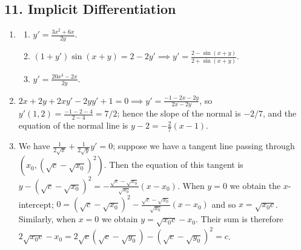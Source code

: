 \subsection*{11. Implicit Differentiation}
\begin{enumerate}
  \item
    \begin{enumerate}
      \item $ y' = \frac{3x^2 + 6x}{2y} $.
      \item $ (1 + y')\sin(x + y) = 2 - 2y' \implies y' = \frac{2 - \sin(x + y)}{2 + \sin(x + y)} $.
      \item $ y' = \frac{20x^3 - 2x}{2y} $.
    \end{enumerate}
  \item $ 2x + 2y + 2xy' - 2yy' + 1 = 0 \implies y' = \frac{-1 - 2x - 2y}{2x - 2y} $, so $ y'(1,2) = \frac{-1 - 2 - 4}{2 - 4} = 7/2 $; hence the
        slope of the normal is $ -2/7 $, and the equation of the normal line is $ y - 2 = -\frac{2}{7}(x - 1) $.
  \item We have $ \frac{1}{2\sqrt{x}} + \frac{1}{2\sqrt{y}} y' = 0 $; suppose we have a tangent line passing through $ (x_0, (\sqrt{c} - \sqrt{x_0})^2) $.
        Then the equation of this tangent is $ y - (\sqrt{c} - \sqrt{x_0})^2 = -\frac{\sqrt{c} - \sqrt{x_0}}{\sqrt{x_0}} (x - x_0) $.
        When $ y = 0 $ we obtain the $ x$-intercept; $ 0 = (\sqrt{c} - \sqrt{x_0})^2 -\frac{\sqrt{c} - \sqrt{x_0}}{\sqrt{x_0}} (x - x_0) $ and so $ x = \sqrt{x_0 c} $.
        Similarly, when $ x = 0 $ we obtain $ y = \sqrt{x_0 c} -  x_0 $. Their sum is therefore $ 2\sqrt{x_0 c} - x_0 = 2\sqrt{c}(\sqrt{c} - \sqrt{y_0}) - (\sqrt{c} - \sqrt{y_0})^2 = c $.
\end{enumerate}

